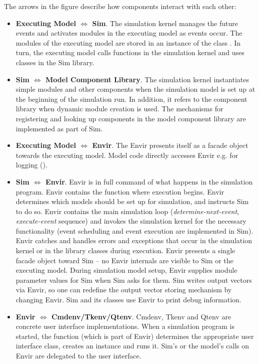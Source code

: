 The arrows in the figure describe how components interact with
each other:

\begin{itemize}
  \item{\textbf{Executing Model $\Leftrightarrow$ Sim}. The simulation kernel
    manages the future events and activates modules in the executing model
    as events occur. The modules of the executing model are stored in an
    instance of the class . In turn, the executing model
    calls functions in the simulation kernel and uses classes in the Sim library.}
  \item{\textbf{Sim $\Leftrightarrow$ Model Component Library}. The simulation kernel
    instantiates simple modules and other components when the simulation model
    is set up at the beginning of the simulation run. In addition, it refers
    to the component library when dynamic module creation is used.
    The mechanisms for registering and looking up components in the model
    component library are implemented as part of Sim.}
  \item{\textbf{Executing Model $\Leftrightarrow$ Envir}. The Envir presents itself
    as a facade object towards the executing model. Model code directly accesses Envir
    e.g. for logging ().}
  \item{\textbf{Sim $\Leftrightarrow$ Envir}. Envir is in full command of what
    happens in the simulation program. Envir contains the  function
    where execution begins. Envir determines which models should be set up
    for simulation, and instructs Sim to do so. Envir contains the main
    simulation loop (\textit{determine-next-event}, \textit{execute-event}
    sequence) and invokes the simulation kernel for the necessary
    functionality (event scheduling and event execution are implemented in Sim).
    Envir catches and handles errors and exceptions that occur
    in the simulation kernel or in the library classes during execution.
    Envir presents a single facade object toward Sim -- no Envir
    internals are visible to Sim or the executing model.
    During simulation model setup, Envir supplies module parameter values for
    Sim when Sim asks for them. Sim writes output vectors via Envir,
    so one can redefine the output vector storing mechanism by changing Envir.
    Sim and its classes use Envir to print debug information.}
  \item{\textbf{Envir $\Leftrightarrow$ Cmdenv/Tkenv/Qtenv}. Cmdenv, Tkenv and Qtenv
    are concrete user interface implementations. When a simulation program
    is started, the  function (which is part of Envir) determines
    the appropriate user interface class, creates an instance and runs it.
    Sim's or the model's calls on Envir are delegated to the user interface.}
\end{itemize}


